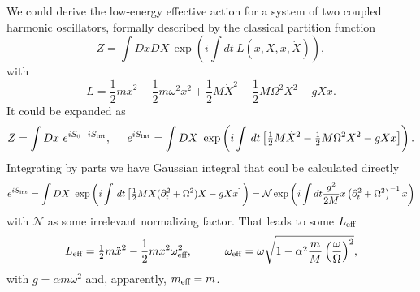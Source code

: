 We could derive the low-energy effective action for a system of two
coupled harmonic oscillators, formally described by the classical partition function
\begin{equation*}
	Z = \int Dx DX \, \exp\left(
		i \int dt\ L(x, X, \dot{x}, \dot{X}) 
	\right),
\end{equation*}
with
\begin{equation*}
	L = \frac{1}{2} m \dot{x}^2 - \frac{1}{2} m \omega^2 x^2 + \frac{1}{2} M \dot{X}^2 - \frac{1}{2} M \Omega^2 X^2 - g X x.
\end{equation*}
It could be expanded as
\begin{equation*}
	Z = \int Dx \ e^{i S_0 + iS_{\textnormal{int}}},
	\hspace{5 mm} 
	e^{ iS_{\textnormal{int}}} = \int D X \ \exp\left(
		i \int \, d t \left[
			\tfrac{1}{2} M \dot{X}^2 - \tfrac{1}{2} M \Omega^2 X^2 - g X x
		\right]
	\right).
\end{equation*}
Integrating by parts we have Gaussian integral that coul be calculated directly
\begin{equation*}
	e^{ iS_{\textnormal{int}}} = \int D X \ \exp\left(
		i \int \, d t \left[
			\tfrac{1}{2} M X(\partial_t^2+ \Omega^2)X - g X x
		\right]
	\right) = \mathcal N \exp\left(
		i \int dt \frac{g^2}{2M} x \left(\partial_t^2 + \Omega^2\right)^{-1} x
	\right)
\end{equation*}
with $\mathcal N$ as some irrelevant normalizing factor. That leads to some $L_{\textnormal{eff}}$
\begin{equation*}
	\sub{L}{eff} = \tfrac{1}{2} m \ddot{x}^2 - \frac{1}{2} m x^2 \sub{\omega}{eff}^2,
	\hspace{10 mm} 
	\sub{\omega}{eff} =  \omega \sqrt{1 - \alpha^2 \frac{m}{M} \left(\frac{\omega}{\Omega}\right)^2},
\end{equation*}
with $g = \alpha m \omega^2$ and, apparently, $m_{\textnormal{eff}} = m$.

